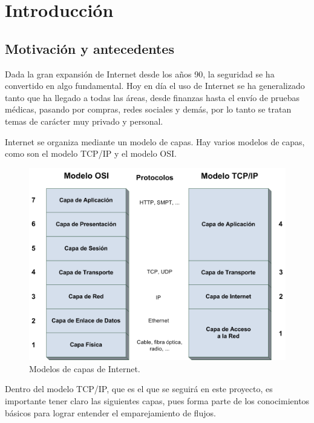 \chapter{Introducción}

\section{Motivación y antecedentes}

Dada la gran expansión de Internet desde los años 90, la seguridad se ha convertido en algo 
fundamental. Hoy en día el uso de Internet se ha generalizado tanto que ha llegado a todas las áreas, 
desde finanzas hasta el envío de pruebas médicas, pasando por compras, redes sociales y demás, por lo tanto 
se tratan temas de carácter muy privado y personal.

\intro Internet se organiza mediante un modelo de capas. Hay varios modelos de capas, como son el modelo TCP/IP y el modelo OSI. \cite{redes2010}

\begin{figure}[H]
  \includegraphics[width=1\textwidth]{imagenes/capas.png}
  \centering
  \caption{Modelos de capas de Internet.}
\end{figure}

Dentro del modelo TCP/IP, que es el que se seguirá en este proyecto, es importante tener claro las siguientes 
capas, pues forma parte de los conocimientos básicos para lograr entender el emparejamiento de flujos.

